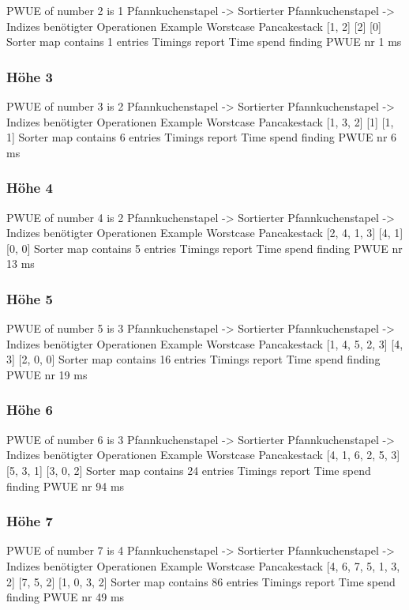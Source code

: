 {    PWUE of number 2 is 1
    Pfannkuchenstapel -> Sortierter Pfannkuchenstapel -> Indizes benötigter Operationen
Example Worstcase Pancakestack
    [1, 2]
    [2]
    [0]
    Sorter map contains 1 entries
    Timings report
    Time spend finding PWUE nr 1 ms
    \subsubsection{Höhe 3}

    PWUE of number 3 is 2
    Pfannkuchenstapel -> Sortierter Pfannkuchenstapel -> Indizes benötigter Operationen
Example Worstcase Pancakestack
    [1, 3, 2]
    [1]
    [1, 1]
    Sorter map contains 6 entries
    Timings report
    Time spend finding PWUE nr 6 ms
    \subsubsection{Höhe 4}

    PWUE of number 4 is 2
    Pfannkuchenstapel -> Sortierter Pfannkuchenstapel -> Indizes benötigter Operationen
Example Worstcase Pancakestack
    [2, 4, 1, 3]
    [4, 1]
    [0, 0]
    Sorter map contains 5 entries
    Timings report
    Time spend finding PWUE nr 13 ms
    \subsubsection{Höhe 5}

    PWUE of number 5 is 3
    Pfannkuchenstapel -> Sortierter Pfannkuchenstapel -> Indizes benötigter Operationen
Example Worstcase Pancakestack
    [1, 4, 5, 2, 3]
    [4, 3]
    [2, 0, 0]
    Sorter map contains 16 entries
    Timings report
    Time spend finding PWUE nr 19 ms
    \subsubsection{Höhe 6}

    PWUE of number 6 is 3
    Pfannkuchenstapel -> Sortierter Pfannkuchenstapel -> Indizes benötigter Operationen
Example Worstcase Pancakestack
    [4, 1, 6, 2, 5, 3]
    [5, 3, 1]
    [3, 0, 2]
    Sorter map contains 24 entries
    Timings report
    Time spend finding PWUE nr 94 ms
    \subsubsection{Höhe 7}

    PWUE of number 7 is 4
    Pfannkuchenstapel -> Sortierter Pfannkuchenstapel -> Indizes benötigter Operationen
Example Worstcase Pancakestack
    [4, 6, 7, 5, 1, 3, 2]
    [7, 5, 2]
    [1, 0, 3, 2]
    Sorter map contains 86 entries
    Timings report
    Time spend finding PWUE nr 49 ms
}
